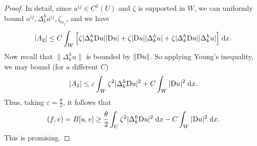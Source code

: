 \documentclass[a4paper]{article}
\begin{document}
\begin{proof}
  In detail, since $a^{ij} \in C^1(U)$ and $\zeta$ is supported in $W$, we can uniformly bound $a^{ij}, \Delta_k^h a^{ij}, \zeta_{x_j}$, and we have
  \[
    |A_2| \leq C \int_W \Big[\zeta |\Delta^h_k \mathrm{D} u| |\mathrm{D} u| + \zeta |\mathrm{D} u| |\Delta_k^h u| + \zeta |\Delta^h_k \mathrm{D} u| |\Delta^h_k u|\Big]\;\mathrm{d} x.
  \]
  Now recall that $\|\Delta^h_k u\|$ is bounded by $\|\mathrm{D} u\|$. So applying Young's inequality, we may bound (for a different $C$)
  \[
    |A_2| \leq \varepsilon \int_W \zeta^2 |\Delta_k^h \mathrm{D} u|^2 + C \int_W |\mathrm{D} u|^2\;\mathrm{d} x.
  \]
  Thus, taking $\varepsilon = \frac{\theta}{2}$, it follows that
  \[
    (f, v) = B[u, v] \geq \frac{\theta}{2} \int_U \zeta^2 |\Delta_k^h \mathrm{D} u|^2 \;\mathrm{d} x - C \int_W |\mathrm{D} u|^2\;\mathrm{d} x.
  \]
  This is promising.


\end{proof}
\end{document}
